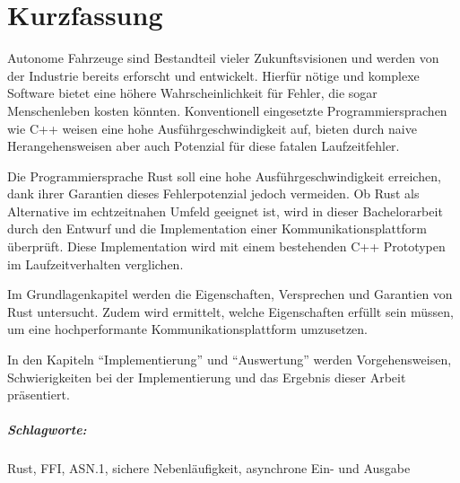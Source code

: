 \chapter*{Kurzfassung}


Autonome Fahrzeuge sind Bestandteil vieler Zukunftsvisionen und werden von der Industrie bereits erforscht und entwickelt.
Hierfür nötige und komplexe Software bietet eine höhere Wahrscheinlichkeit für Fehler, die sogar Menschenleben kosten könnten.
Konventionell eingesetzte Programmiersprachen wie C++ weisen eine hohe Ausführgeschwindigkeit auf, bieten durch naive Herangehensweisen aber auch Potenzial für diese fatalen Laufzeitfehler.

Die Programmiersprache Rust soll eine hohe Ausführgeschwindigkeit erreichen, dank ihrer Garantien dieses Fehlerpotenzial jedoch vermeiden.
Ob Rust als Alternative im echtzeitnahen Umfeld geeignet ist, wird in dieser Bachelorarbeit durch den Entwurf und die Implementation einer Kommunikationsplattform überprüft.
Diese Implementation wird mit einem bestehenden C++ Prototypen im Laufzeitverhalten verglichen.



Im Grundlagenkapitel werden  die Eigenschaften, Versprechen und Garantien von Rust untersucht.
Zudem wird ermittelt, welche Eigenschaften erfüllt sein müssen, um eine hochperformante Kommunikationsplattform umzusetzen.

In den Kapiteln \enquote{Implementierung} und \enquote{Auswertung} werden Vorgehensweisen, Schwierigkeiten bei der Implementierung und das Ergebnis dieser Arbeit präsentiert.

\paragraph{Schlagworte:} Rust, FFI, ASN.1, sichere Nebenläufigkeit, asynchrone Ein- und Ausgabe